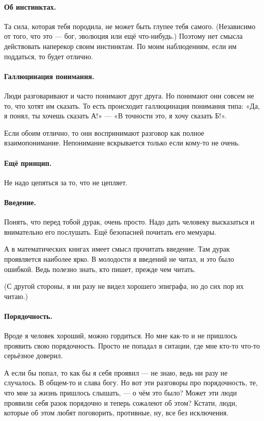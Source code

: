\documentclass{book}
\begin{document}
\paragraph{Об инстинктах.}
Та сила, которая тебя породила, не может быть глупее тебя самого.
(Независимо от того, что это --- бог, эволюция или ещё что-нибудь.)
Поэтому нет смысла действовать наперекор своим инстинктам.
По моим наблюдениям, если им поддаться, то будет отлично. 

\paragraph{Галлюцинация понимания.}
Люди разговаривают и часто понимают друг друга.
Но понимают они совсем не то, что хотят им сказать.
То есть происходит галлюцинация понимания типа: «Да, я понял, ты хочешь сказать А!» --- «В точности это, я хочу сказать Б!».

Если обоим отлично, то они воспринимают разговор как полное взаимопонимание.
Непонимание вскрывается только если кому-то не очень.

\paragraph{Ещё принцип.}
Не надо цепяться за то, что не цепляет.

\paragraph{Введение.}
Понять, что перед тобой дурак, очень просто.
Надо дать человеку высказаться и внимательно его послушать.
Ещё безопасней почитать его мемуары.

А в математических книгах имеет смысл прочитать введение.
Там дурак проявляется наиболее ярко.
В молодости я введений не читал, и это было ошибкой. 
Ведь полезно знать, кто пишет, прежде чем читать.

(С другой стороны, я ни разу не видел хорошего эпиграфа, но до сих пор их читаю.)

\paragraph{Порядочность.}
Вроде я человек хороший, можно гордиться.
Но мне как-то и не пришлось проявить свою порядочность.
Просто не попадал в ситации, где мне кто-то что-то серьёзное доверил.

А если бы попал, то как бы я себя проявил --- не знаю, ведь ни разу не случалось.
В общем-то и слава богу.
Но вот эти разговоры про порядочность, те, что мне за жизнь пришлось слышать, --- о чём это было?
Может эти люди проявили себя разок порядочно и теперь сожалеют об этом?
Кстати, люди, которые об этом любят поговорить, противные, ну, все без исключения.
\end{document}
